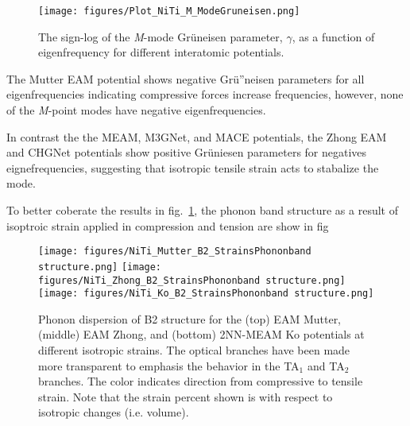 \documentclass[preprint,colorlinks=true,linkcolor=black,citecolor=black]{elsarticle}
\begin{document}
\begin{figure}[!htp]
	 \centering
	\texttt{[image: figures/Plot\_NiTi\_M\_ModeGruneisen.png]}
	\label{fig:modegruneisen}
	\caption{The sign-log of the \textit{M}-mode Gr\"{u}neisen
	parameter, $\gamma$, as a function of eigenfrequency for different
	interatomic potentials.}
\end{figure}

The Mutter EAM potential shows negative Gr\"{u}''neisen parameters for
all eigenfrequencies indicating compressive forces increase
frequencies, however, none of the \textit{M}-point modes have negative
eigenfrequencies. \par

In contrast the the MEAM, M3GNet, and MACE potentials, the Zhong EAM
and CHGNet potentials show positive Gr\"{u}niesen parameters for
negatives eignefrequencies, suggesting that isotropic tensile strain
acts to stabalize the mode. \par

To better coberate the results in fig.~\ref{fig:modegruneisen}, the
phonon band structure as a result of isoptroic strain applied in
compression and tension are show in fig

\begin{figure}[!htp]
	\begin{centering}
		\texttt{[image: figures/NiTi\_Mutter\_B2\_StrainsPhononband
			structure.png]} \vspace{1mm}
		\texttt{[image: figures/NiTi\_Zhong\_B2\_StrainsPhononband
			structure.png]} \vspace{1mm}
		\texttt{[image: figures/NiTi\_Ko\_B2\_StrainsPhononband
			structure.png]}
		\caption{ Phonon dispersion of B2 structure for the (top) EAM
			Mutter, (middle) EAM Zhong, and (bottom) 2NN-MEAM Ko potentials
			at different isotropic strains. The optical branches have been
			made more transparent to emphasis the behavior in the TA$_1$ and
			TA$_2$ branches. The color indicates direction from compressive
			to tensile strain. Note that the strain percent shown is with
			respect to isotropic changes (i.e. volume).  }
		\label{fig:mutter_zhong_ko_phonon_b2}
	\end{centering}
\end{figure}

\end{document}
